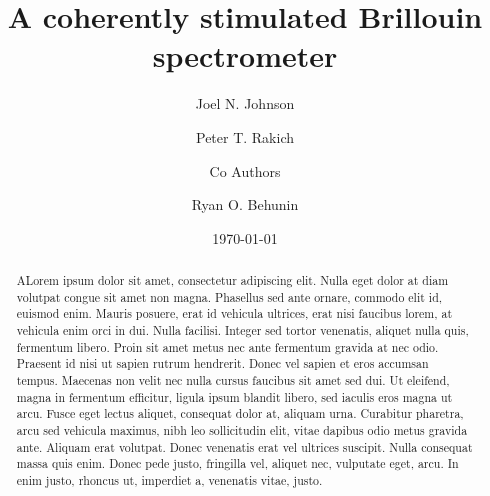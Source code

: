 \documentclass[%
  reprint,
  superscriptaddress,
  amsmath,amssymb,
  aps,
  prapplied,
]{revtex4-2}
\begin{document}

\title{A coherently stimulated Brillouin spectrometer}

\author{Joel N. Johnson}

\author{Peter T. Rakich}

\author{Co Authors}

\author{Ryan O. Behunin}

\date{\today}

\begin{abstract}
ALorem ipsum dolor sit amet, consectetur adipiscing elit. Nulla eget dolor at diam volutpat congue sit amet non magna. Phasellus sed ante ornare, commodo elit id, euismod enim. Mauris posuere, erat id vehicula ultrices, erat nisi faucibus lorem, at vehicula enim orci in dui. Nulla facilisi. Integer sed tortor venenatis, aliquet nulla quis, fermentum libero. Proin sit amet metus nec ante fermentum gravida at nec odio. Praesent id nisi ut sapien rutrum hendrerit. Donec vel sapien et eros accumsan tempus. Maecenas non velit nec nulla cursus faucibus sit amet sed dui. Ut eleifend, magna in fermentum efficitur, ligula ipsum blandit libero, sed iaculis eros magna ut arcu. Fusce eget lectus aliquet, consequat dolor at, aliquam urna. Curabitur pharetra, arcu sed vehicula maximus, nibh leo sollicitudin elit, vitae dapibus odio metus gravida ante. Aliquam erat volutpat. Donec venenatis erat vel ultrices suscipit. Nulla consequat massa quis enim. Donec pede justo, fringilla vel, aliquet nec, vulputate eget, arcu. In enim justo, rhoncus ut, imperdiet a, venenatis vitae, justo.

\end{abstract}
\end{document}
